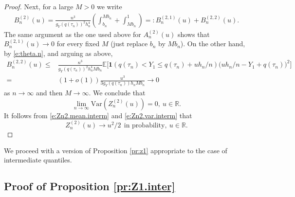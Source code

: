 \documentclass[12pt]{amsart}
\newcommand{\bbr}{\mathbb{R}}
\newcommand{\1}{\mathbbm{1}}
\newcommand{\0}{\mathbf{0}}
\newcommand{\one}{\mathbf{1}}
\newcommand{\E}{\mathbb{E}}
\newcommand{\var}{\mathrm{Var}}
\theoremstyle{plain}
\theoremstyle{definition}
\begin{document}
\begin{proof}
Next, for a large $M>0$ we write 
\begin{align*}
B_n^{(2)}(u) = \frac{n^3}{g_Y(q(\tau_n))^2h_n^4} \left(
  \int_{b_n}^{Mb_n} + \int_{Mb_n}^{1} \right)=: B_n^{(2,1)}(u)+ 
  B_n^{(2,2)}(u).
\end{align*}
The same argument as the one used above for $A_n^{(2)}(u)$ shows that
$B_n^{(2,1)}(u)\to 0$ for every fixed $M$ (just replace $b_n$ by
$Mb_n$). On the other hand,  by \eqref{e:theta.n}, and arguing as
above, 
 \begin{align*}
B_n^{(2,2)}(u) \leq&  \frac{n^3}{g_Y(q(\tau_n))^2h_n^4Mb_n}\E\bigl[  \one
  (q(\tau_n)<Y_1\leq q(\tau_n)+uh_n/n) \bigl( uh_n/n-Y_1+q(\tau_n)\bigr)^2
   \bigr]\\
=& (1+o(1)) \frac{u^3}{3g_Y(q(\tau_n)) h_nMb_n}
\to 0 
\end{align*}
as $n\to\infty$ and then $M\to\infty$. We conclude that
%
\begin{equation} \label{e:Zn2.var.interm}
\lim_{n\to\infty} \var(Z_n^{(2)}(u))= 0, \ u\in\bbr.
\end{equation}
%
It follows from \eqref{e:Zn2.mean.interm} and \eqref{e:Zn2.var.interm}
that
\begin{equation*} \label{e:Zn2.prob.interm}
Z_n^{(2)}(u)\to u^2/2 \ \ \text{in probability}, \ u\in\bbr.
\end{equation*}
\end{proof}

We proceed with a version of Proposition \ref{pr:z1} appropriate to the case of intermediate quantiles. 

\subsection{Proof of Proposition \ref{pr:Z1.inter} }
\end{document}
